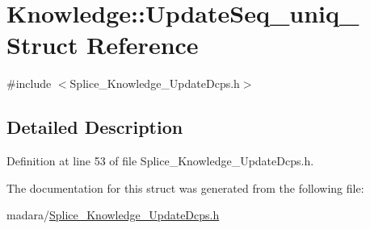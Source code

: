 \hypertarget{structKnowledge_1_1UpdateSeq__uniq__}{
\section{Knowledge::UpdateSeq\_\-uniq\_\- Struct Reference}
\label{d4/d5a/structKnowledge_1_1UpdateSeq__uniq__}
}


{\ttfamily \#include $<$Splice\_\-Knowledge\_\-UpdateDcps.h$>$}



\subsection{Detailed Description}


Definition at line 53 of file Splice\_\-Knowledge\_\-UpdateDcps.h.



The documentation for this struct was generated from the following file:\begin{DoxyCompactItemize}
\item 
madara/\hyperlink{Splice__Knowledge__UpdateDcps_8h}{Splice\_\-Knowledge\_\-UpdateDcps.h}\end{DoxyCompactItemize}
